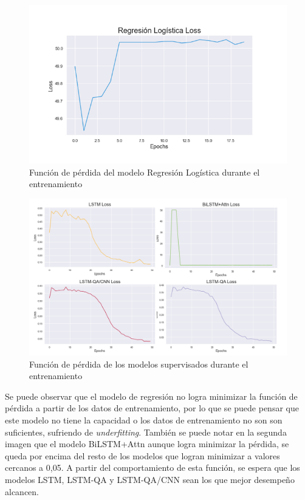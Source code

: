 \begin{figure}[!tb]
  \begin{center}
    \includegraphics[angle=0, width=1\textwidth]{Graphics/loss_lreg.png}
  \end{center}
    \caption{Función de pérdida del modelo Regresión Logística durante el entrenamiento}\label{loss_lreg}
\end{figure}

\begin{figure}[!tb]
  \begin{center}
    \includegraphics[angle=0, width=1\textwidth]{Graphics/loss_all.png}
  \end{center}
    \caption{Función de pérdida de los modelos supervisados durante el entrenamiento}\label{loss_all}
\end{figure}

Se puede observar que el modelo de regresión no logra minimizar la función de pérdida a partir de los datos de entrenamiento, por lo que se puede pensar que este modelo no tiene la capacidad o los datos de entrenamiento no son son suficientes, sufriendo de \textit{underfitting}. También se puede notar en la segunda imagen que el modelo BiLSTM+Attn aunque logra minimizar la pérdida, se queda por encima del resto de los modelos que logran minimizar a valores cercanos a 0,05. A partir del comportamiento de esta función, se espera que los modelos LSTM, LSTM-QA y LSTM-QA/CNN sean los que mejor desempeño alcancen.

